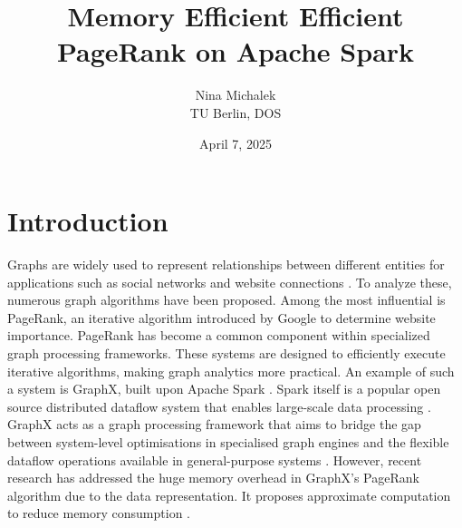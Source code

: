 \documentclass[a4paper,12pt]{article}
\title{Memory Efficient Efficient PageRank on Apache Spark}
\author{Nina Michalek\\TU Berlin, DOS}
\date{April 7, 2025}
\begin{document}
\maketitle


\section{Introduction}
 Graphs are widely used to represent relationships between different entities for applications such as social networks and website connections \cite{zhang_distributed_2021}. 
To analyze these, numerous graph algorithms have been proposed. Among the most influential is PageRank, an iterative algorithm introduced by Google to determine website importance. PageRank has become a common component within specialized graph processing frameworks. These systems are designed to efficiently execute iterative algorithms, making graph analytics more practical. An example of such a system is GraphX, built upon Apache Spark \cite{xin_graphx_2013}. Spark itself is a popular open source distributed dataflow system that enables large-scale data processing \cite{shanahan_large_2015}. GraphX acts as a graph processing framework that aims to bridge the gap between system-level optimisations in specialised graph engines and the flexible dataflow operations available in general-purpose systems \cite{noauthor_software_nodate}. However, recent research has addressed the huge memory overhead in GraphX's PageRank algorithm due to the data representation. It proposes approximate computation to reduce memory consumption \cite{wu_efficient_2024}. 


\end{document}
